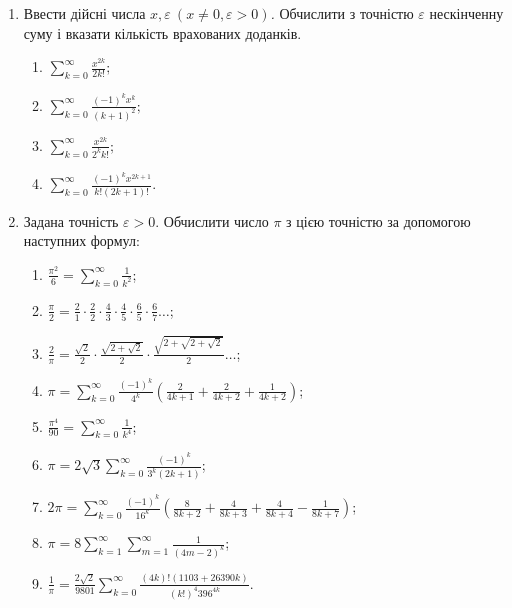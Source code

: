\documentclass[]{article}
\makeatletter
\newcommand{\xslalph}[1]{\expandafter\@xslalph\csname c@#1\endcsname}
\newcommand{\@xslalph}[1]{%
    \ifcase#1\or а\or б\or в\or г\or д\or e\or є\or ж\or з\or i%
    \or й\or к\or л\or м\or н\or о\or п\or р\or с\or т%
    \or у\or ф\or х\or ц\or ч\or ш\or ю\or я\or аа\or бб\or вв %
    \else\@ctrerr\fi%
}
\makeatother
\begin{document}
\begin{enumerate}
\item
  Ввести дійсні числа
  \(x,\varepsilon\ (x \neq 0,\varepsilon > 0)\)\emph{.} Обчислити з
  точністю \(\varepsilon\) нескінченну суму і вказати кількість
  врахованих доданків.
\begin{enumerate}[label=\xslalph*)]
\item \(\sum\limits_{k = 0}^{\infty}\frac{x^{2k}}{2k!};\) 
\item \(\sum\limits_{k = 0}^{\infty}\frac{( - 1)^{k}x^{k}}{(k + 1)^{2}};\)
\item \(\sum\limits_{k = 0}^{\infty}\frac{x^{2k}}{2^{k}k!};\) 
\item \(\sum\limits_{k = 0}^{\infty}\frac{( - 1)^{k}x^{2k + 1}}{k!(2k + 1)!}.\)
\end{enumerate}

\item 
 
 Задана точність $\varepsilon>0$. Обчислити число $\pi$ 
з цією точністю за допомогою наступних формул:
  \begin{enumerate}[label=\xslalph*)]
\item
 $ \frac{\pi^2}{6} = \sum\limits_{k=0}^{\infty} \frac{1}{k^2} $;
\item
 $\frac{\pi}{2} = \frac{2}{1} \cdot \frac{2}{2} \cdot \frac{4}{3} \cdot \frac{4}{5} \cdot \frac{6}{5}\cdot \frac{6}{7} \ldots $;
\item
$\frac{2}{\pi} = \frac{\sqrt{2}}{2} \cdot \frac{\sqrt{2 + \sqrt{2}}}{2} \cdot \frac{\sqrt{2 + \sqrt{2+\sqrt{2}}}}{2} \ldots $;
\item
$\pi = \sum\limits_{k=0}^{\infty} \frac{(-1)^{k}}{4^{k}}\left( \frac{2}{4k+1} + \frac{2}{4k+2} + \frac{1}{4k+2}\right)$;
\item
 $ \frac{\pi^4}{90} = \sum\limits_{k=0}^{\infty} \frac{1}{k^4} $;
\item
 $ \pi = 2\sqrt{3} \sum\limits_{k=0}^{\infty} \frac{(-1)^{k}}{3^{k}(2k+1)} $;
\item
$ 2\pi = \sum\limits_{k=0}^{\infty} \frac{(-1)^{k}}{16^{k}}\left( \frac{8}{8k+2} + \frac{4}{8k+3} + \frac{4}{8k+4}  - \frac{1}{8k+7}\right)$;
\item
$ \pi = 8 \sum\limits_{k=1}^{\infty} \sum\limits_{m=1}^{\infty} \frac{1}{(4m-2)^{k}} $;
\item
$ \frac{1}{\pi} = \frac{2 \sqrt{2}}{9801} \sum\limits_{k=0}^{\infty}  \frac{(4k)!(1103 +26390k)}{(k!)^{4}396^{4k}} $.

  \end{enumerate}

\end{enumerate}
\end{document}

